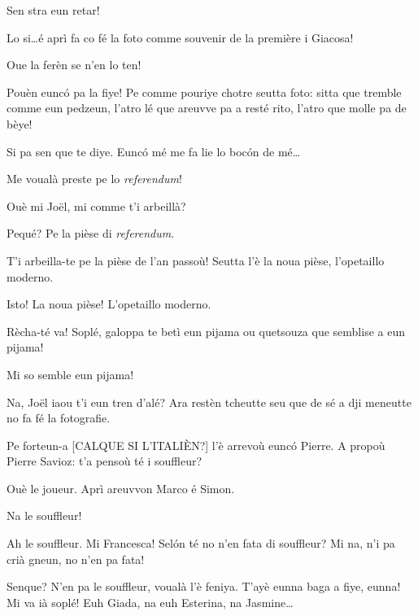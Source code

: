 \begin{drama}
\Francescaspeaks Sen stra eun retar!

\Joellespeaks Lo si\ldots é aprì fa co fé la foto comme souvenir de la première i Giacosa!

\Francescaspeaks Oue la ferèn se n'en lo ten!

 \Joellespeaks Pouèn euncó pa la fiye! Pe comme pouriye chotre seutta foto: sitta  que tremble comme eun pedzeun, l’atro lé  que areuvve pa a resté rito, l'atro que molle pa de bèye!
 
 \Francescaspeaks Si pa sen que te diye. Euncó mé me fa lie lo boc\'on de mé\ldots
 

\Joelspeaks{} Me voualà preste pe lo \textit{referendum}!

\Joellespeaks Ouè mi Jo\"{e}l, mi comme t'i arbeillà?

\Joelspeaks Pequé? Pe la pièse di \textit{referendum}.

\Joellespeaks T'i arbeilla-te pe la pièse de l'an passoù! Seutta l'è la noua pièse, l’opetaillo moderno.

\Joelspeaks Isto! La noua pièse! L'opetaillo moderno.

\Joellespeaks Rècha-té va! Soplé, galoppa te betì eun pijama ou quetsouza que semblise a eun pijama!

\Joelspeaks Mi so semble eun pijama!


\Francescaspeaks{} Na, Jo\"{e}l iaou t'i eun tren d'alé? Ara restèn tcheutte seu que de sé a dji meneutte no fa fé la fotografie. 


\Francescaspeaks Pe forteun-a [CALQUE SI L'ITALIÈN?] l'è arrevoù euncó Pierre.  A propoù Pierre Savioz: t'a pensoù té i souffleur?

\Pierrespeaks Ouè le joueur. Aprì areuvvon Marco é Simon.

\Francescaspeaks Na le souffleur!
 
\Pierrespeaks Ah le souffleur. Mi Francesca! Sel\'on té no n'en fata di souffleur? Mi na, n'i pa crià gneun, no n'en pa fata!
 
\Cimaspeaks Senque? N'en pa le souffleur, voualà l'è feniya. T'ayè eunna baga a fiye, eunna!  Mi va ià soplé!  Euh Giada, na euh Esterina, na Jasmine\ldots


\end{drama}
